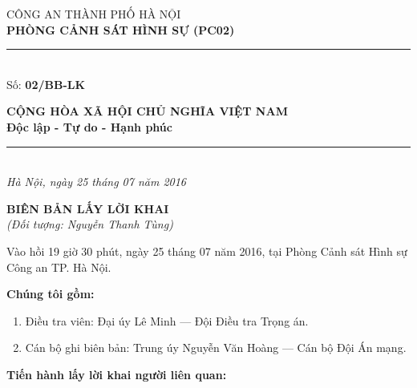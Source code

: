 \documentclass[12pt,a4paper]{article}
\begin{document}
\noindent
\begin{minipage}[t]{0.46\textwidth}
    \begin{center}
        \fontsize{11pt}{13pt}\selectfont
        CÔNG AN THÀNH PHỐ HÀ NỘI\\
        \textbf{PHÒNG CẢNH SÁT HÌNH SỰ (PC02)}\\[-0.2em]
        \rule{3.2cm}{0.6pt}\\[0.25cm]
        \fontsize{11pt}{13pt}\selectfont Số: \textbf{02/BB-LK}
    \end{center}
\end{minipage}
\hfill
\begin{minipage}[t]{0.52\textwidth}
    \begin{center}
        \fontsize{11pt}{13pt}\selectfont
        \textbf{CỘNG HÒA XÃ HỘI CHỦ NGHĨA VIỆT NAM}\\
        \textbf{Độc lập - Tự do - Hạnh phúc}\\[-0.2em]
        \rule{3.6cm}{0.6pt}\\[0.25cm]
        \textit{Hà Nội, ngày 25 tháng 07 năm 2016}
    \end{center}
\end{minipage}

\vspace{0.5cm}

\begin{center}
    \textbf{\Large BIÊN BẢN LẤY LỜI KHAI}\\[0.15cm]
    \textit{(Đối tượng: Nguyễn Thanh Tùng)}
\end{center}

\vspace{0.3cm}


Vào hồi 19 giờ 30 phút, ngày 25 tháng 07 năm 2016, tại Phòng Cảnh sát Hình sự Công an TP. Hà Nội.

\textbf{Chúng tôi gồm:}

\begin{enumerate}[label=\arabic*., leftmargin=*, itemsep=2pt, topsep=2pt, parsep=0pt]
  \item Điều tra viên: Đại úy Lê Minh — Đội Điều tra Trọng án.
  \item Cán bộ ghi biên bản: Trung úy Nguyễn Văn Hoàng — Cán bộ Đội Án mạng.

\end{enumerate}
\textbf{Tiến hành lấy lời khai người liên quan:}
\end{document}
